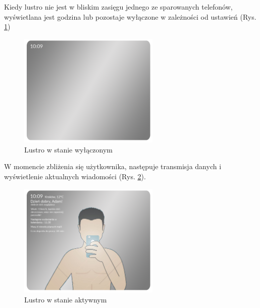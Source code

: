 \documentclass[a4paper,11pt]{article}
\begin{document}
Kiedy lustro nie jest w bliskim zasięgu jednego ze sparowanych telefonów, wyświetlana jest godzina lub pozostaje wyłączone w zależności od ustawień (Rys. \ref{lustro_off})

\begin{figure}[H]
	\includegraphics[width=0.6\textwidth,center]{mirror_off.png}
	\caption {Lustro w stanie wyłączonym}
	\label{lustro_off}
\end{figure}

W momencie zbliżenia się użytkownika, następuje transmisja danych i wyświetlenie aktualnych wiadomości (Rys. \ref{lustro_on}).

\begin{figure}[H]
	\includegraphics[width=0.6\textwidth,center]{mirror_on.png}
	\caption {Lustro w stanie aktywnym}
	\label{lustro_on}
\end{figure}
\end{document}
